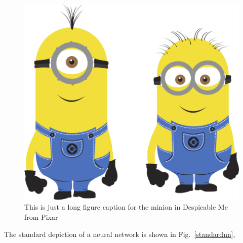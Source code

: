 \documentclass[thesis]{subfiles}
\begin{document}
\begin{figure}[htbp!] 
\centering    
\includegraphics[width=1.0\textwidth]{minion}
\caption[Minion]{This is just a long figure caption for the minion in Despicable Me from Pixar}
\label{fig:minion}
\end{figure}

The standard depiction of a neural network is shown in Fig.~\ref{standardnn}, 
\end{document}

